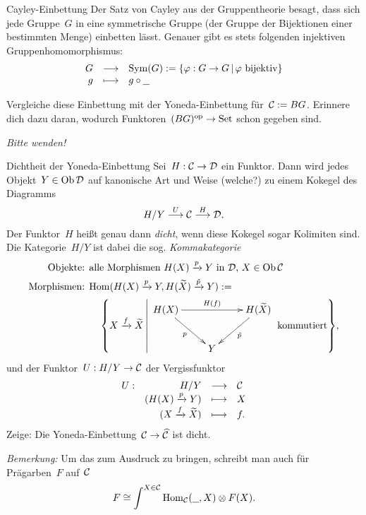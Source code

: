 \documentclass{pizzablatt}
\begin{document}
\begin{aufgabe}{Cayley-Einbettung}
Der Satz von Cayley aus der Gruppentheorie besagt, dass sich jede Gruppe~$G$ in
eine symmetrische Gruppe (der Gruppe der Bijektionen einer bestimmten Menge)
einbetten lässt. Genauer gibt es stets folgenden injektiven
Gruppenhomomorphismus:
\[ \begin{array}{@{}rcl@{}}
  G &\longrightarrow& \operatorname{Sym}(G) := \{ \varphi : G \to G \,|\,
  \text{$\varphi$ bijektiv} \} \\
  g &\longmapsto& g \circ \freist
\end{array} \]

Vergleiche diese Einbettung mit der Yoneda-Einbettung für~$\mathcal{C} := BG$.
Erinnere dich dazu daran, wodurch Funktoren~$(BG)^{\mathrm{op}} \to \mathrm{Set}$ schon gegeben
sind.
\end{aufgabe}

\emph{Bitte wenden!}

\newpage

\begin{aufgabe}{Dichtheit der Yoneda-Einbettung}
Sei~$H:\mathcal{C}\to\mathcal{D}$ ein Funktor. Dann wird jedes Objekt~$Y \in \operatorname{Ob}\mathcal{D}$ auf
kanonische Art und Weise (welche?) zu einem Kokegel des Diagramms
\[ H/Y \stackrel{U}{\longrightarrow} \mathcal{C} \stackrel{H}{\longrightarrow} \mathcal{D}. \]
Der Funktor~$H$ heißt genau dann \emph{dicht}, wenn diese Kokegel sogar
Kolimiten sind. Die Kategorie~$H/Y$ ist dabei die sog. \emph{Kommakategorie}
\begin{align*}
  \text{Objekte: } & \text{alle Morphismen $H(X) \xra{p} Y$ in~$\D$, $X \in \Ob\C$} \\
  \text{Morphismen: } &
    \Hom(H(X) \xra{p} Y, H(\widetilde X) \xra{\tilde p} Y) := \\ &
      \quad\left\{ X \xra{f} \widetilde X \,\middle|\, \text{$
        \vcenter{\xymatrix{
          H(X) \ar[rr]^{H(f)} \ar[rd]_p && H(\widetilde X) \ar[dl]^{\tilde p} \\
          & Y
        }}$ kommutiert} \right\}\!,
\end{align*}
und der Funktor~$U : H/Y \to \mathcal{C}$ der Vergissfunktor
\[ \begin{array}{@{}rrcl@{}}
  U : & H/Y &\longrightarrow& \C \\
  & (H(X) \xra{p} Y) &\longmapsto& X \\
  & (X \xra{f} \widetilde X) &\longmapsto& f.
\end{array} \]
Zeige: Die Yoneda-Einbettung~$\mathcal{C} \to \widehat{\mathcal{C}}$ ist dicht.

\emph{Bemerkung:} Um das zum Ausdruck zu bringen, schreibt man auch für
Prägarben~$F$ auf~$\mathcal{C}$
\[ F \cong \int^{X \in \mathcal{C}} \mathrm{Hom}_{\mathcal{C}}(\underline{\ \ },X) \otimes F(X). \]
\end{aufgabe}
\end{document}
